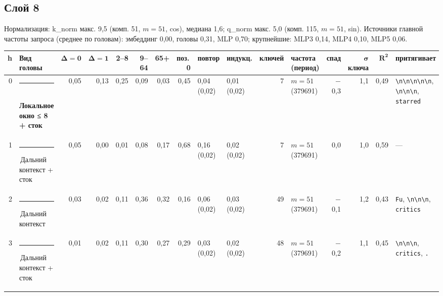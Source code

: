 \documentclass[10pt]{article}
\begin{document}
\noindent\begin{minipage}{\linewidth}
\subsection*{Слой 8}
{\small\color{ink2} Нормализация: k\_norm макс. 9,5 (комп. 51, $m{=}51$, cos), медиана 1,6; q\_norm макс. 5,0 (комп. 115, $m{=}51$, sin). Источники главной частоты запроса (среднее по головам): эмбеддинг 0,00, головы 0,31, MLP 0,70; крупнейшие: MLP3 0,14, MLP4 0,10, MLP5 0,06.}
\begin{center}{\footnotesize\begin{tabular}{|r|l|r|r|r|r|r|r|l|l|r|l|r|r|r|l|}
\hline
\rowcolor{head}\textbf{h} & \textbf{Вид головы} & $\boldsymbol{\Delta{=}0}$ & $\boldsymbol{\Delta{=}1}$ & \textbf{2–8} & \textbf{9–64} & \textbf{65+} & \textbf{поз.\,0} & \textbf{повтор} & \textbf{индукц.} & \textbf{ключей} & \textbf{частота (период)} & \textbf{спад} & $\boldsymbol{\sigma}$ \textbf{ключа} & $\boldsymbol{R^2}$ & \textbf{притягивает} \\ \hline
0 & \textcolor[HTML]{1BAF7A}{\rule{0.62em}{0.62em}}\,\textbf{Локальное окно ≤ 8 + сток} & 0,05 & 0,13 & 0,25 & 0,09 & 0,03 & 0,45 & 0,04 (0,02) & 0,01 (0,02) & 7 & $m{=}51$ (379691) & $-$0,3 & 1,1 & 0,49 & \texttt{\textvisiblespace{}\textbackslash{}n\textbackslash{}n\textbackslash{}n\textbackslash{}n\textbackslash{}n}, \texttt{\textvisiblespace{}\textbackslash{}n\textbackslash{}n\textbackslash{}n}, \texttt{\textvisiblespace{}starred} \\ \hline
1 & \textcolor[HTML]{C3C2B7}{\rule{0.62em}{0.62em}}\,Дальний контекст + сток & 0,05 & 0,00 & 0,01 & 0,08 & 0,17 & 0,68 & 0,16 (0,02) & 0,02 (0,02) & 7 & $m{=}51$ (379691) & 0,0 & 1,0 & 0,59 & — \\ \hline
2 & \textcolor[HTML]{C3C2B7}{\rule{0.62em}{0.62em}}\,Дальний контекст & 0,03 & 0,02 & 0,11 & 0,36 & 0,32 & 0,16 & 0,06 (0,02) & 0,03 (0,02) & 49 & $m{=}51$ (379691) & $-$0,1 & 1,2 & 0,43 & \texttt{\textvisiblespace{}Fu}, \texttt{\textvisiblespace{}\textbackslash{}n\textbackslash{}n\textbackslash{}n}, \texttt{\textvisiblespace{}critics} \\ \hline
3 & \textcolor[HTML]{C3C2B7}{\rule{0.62em}{0.62em}}\,Дальний контекст + сток & 0,01 & 0,02 & 0,11 & 0,30 & 0,27 & 0,29 & 0,03 (0,02) & 0,02 (0,02) & 48 & $m{=}51$ (379691) & $-$0,2 & 1,1 & 0,45 & \texttt{\textvisiblespace{}\textbackslash{}n\textbackslash{}n\textbackslash{}n}, \texttt{\textvisiblespace{}critics}, \texttt{\textvisiblespace{}.} \\ \hline

\end{tabular}}
\end{center}
\end{minipage}
\end{document}

